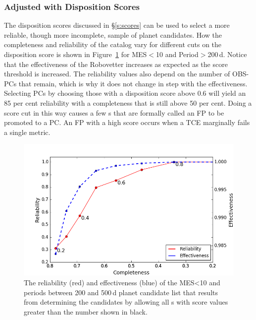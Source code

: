 \subsubsection{Adjusted with Disposition Scores}
\label{s:crscores}
The disposition scores discussed in \S\ref{s:scores} can be used to select a more reliable, though more incomplete, sample of planet candidates.  How the completeness and reliability of the catalog vary for different cuts on the disposition score is shown in Figure~\ref{f:adjscore} for MES$<$10 and Period$>$200\,d. 
Notice that the effectiveness of the Robovetter increases as expected as the score threshold is increased.  
The reliability values also depend on the number of OBS-PCs that remain, which is why it does not change in step with the effectiveness.
Selecting PCs by choosing those with a disposition score above 0.6 will yield an 85 per cent reliability with a completeness that is still above 50 per cent. Doing a score cut in this way causes a few \opstce s that are formally called an FP to be promoted to a PC. An FP with a high score occurs when a TCE marginally fails a single metric.

\begin{figure}[h!]
 \begin{center}
  \includegraphics[width=1.0\linewidth]{fig-CRadjustScore-DR25.png}
  \caption{\label{f:adjscore}The reliability (red) and effectiveness (blue) of the MES<10 and periods between 200 and 500\,d planet candidate list that results from determining the candidates by allowing all \opstce s with score values greater than the number shown in black.}
 \end{center}
 \end{figure}


